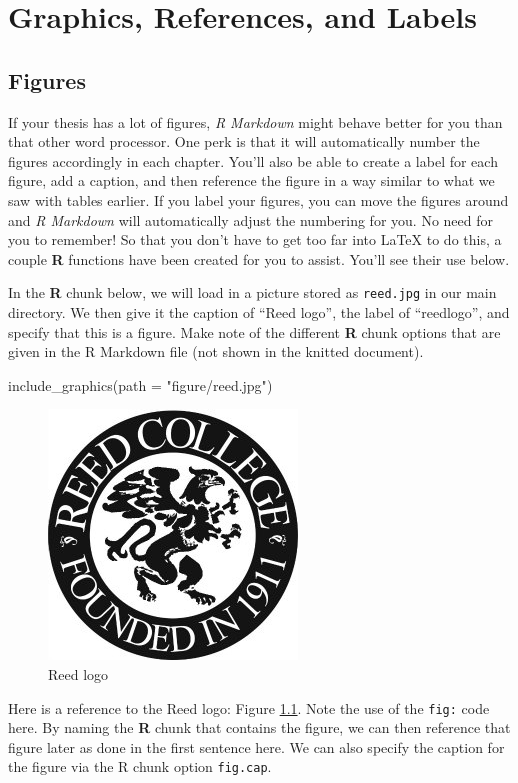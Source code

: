 \documentclass[12pt,twoside]{reedthesis}
\newenvironment{Shaded}{\begin{snugshade}}{\end{snugshade}}
\newcommand{\AttributeTok}[1]{\textcolor[rgb]{0.77,0.63,0.00}{#1}}
\newcommand{\FunctionTok}[1]{\textcolor[rgb]{0.00,0.00,0.00}{#1}}
\newcommand{\NormalTok}[1]{#1}
\newcommand{\StringTok}[1]{\textcolor[rgb]{0.31,0.60,0.02}{#1}}
\begin{document}
\hypertarget{ref-labels}{%
\chapter{Graphics, References, and Labels}\label{ref-labels}}

\hypertarget{figures}{%
\section{Figures}\label{figures}}

If your thesis has a lot of figures, \emph{R Markdown} might behave better for you than that other word processor. One perk is that it will automatically number the figures accordingly in each chapter. You'll also be able to create a label for each figure, add a caption, and then reference the figure in a way similar to what we saw with tables earlier. If you label your figures, you can move the figures around and \emph{R Markdown} will automatically adjust the numbering for you. No need for you to remember! So that you don't have to get too far into LaTeX to do this, a couple \textbf{R} functions have been created for you to assist. You'll see their use below.

In the \textbf{R} chunk below, we will load in a picture stored as \texttt{reed.jpg} in our main directory. We then give it the caption of ``Reed logo'', the label of ``reedlogo'', and specify that this is a figure. Make note of the different \textbf{R} chunk options that are given in the R Markdown file (not shown in the knitted document).
\begin{Shaded}
\begin{Highlighting}[]
\FunctionTok{include\_graphics}\NormalTok{(}\AttributeTok{path =} \StringTok{"figure/reed.jpg"}\NormalTok{)}
\end{Highlighting}
\end{Shaded}
\begin{figure}

{\centering \includegraphics[width=0.2\linewidth]{figure/reed} 

}

\caption{Reed logo}\label{fig:reedlogo}
\end{figure}
Here is a reference to the Reed logo: Figure \ref{fig:reedlogo}. Note the use of the \texttt{fig:} code here. By naming the \textbf{R} chunk that contains the figure, we can then reference that figure later as done in the first sentence here. We can also specify the caption for the figure via the R chunk option \texttt{fig.cap}.
\end{document}
